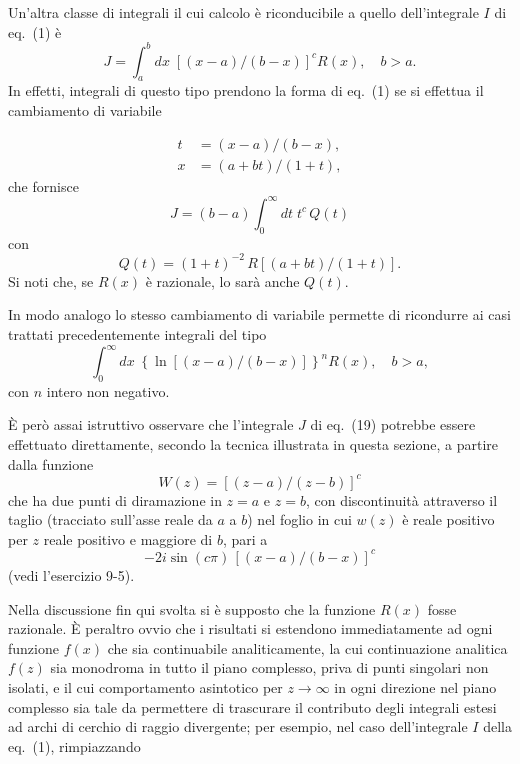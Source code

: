 \documentclass[11pt, a4paper]{book}
\numberwithin{equation}{section}
\begin{document}
\medskip
Un'altra classe di integrali il cui calcolo è riconducibile a quello
dell'integrale $I$ di eq.~(1) è
\begin{equation}
    J = \int_a^b dx\; \left[(x-a)/(b-x)\right]^c R(x), \quad b > a. \tag{19}
\end{equation}
In effetti, integrali di questo tipo prendono la forma di eq.~(1) se si effettua
il cambiamento di variabile


\begin{align}
    t &= (x-a)/(b-x), \tag{20a}\\
    x &= (a+bt)/(1+t), \tag{20b}
\end{align}
che fornisce
\begin{equation}
    J = (b-a)\int_0^\infty dt\; t^c\, Q(t) \tag{21}
\end{equation}
con
\begin{equation}
    Q(t) = (1+t)^{-2}\, R\!\left[(a+bt)/(1+t)\right]. \tag{22}
\end{equation}
Si noti che, se $R(x)$ è razionale, lo sarà anche $Q(t)$.

In modo analogo lo stesso cambiamento di variabile permette di ricondurre
ai casi trattati precedentemente integrali del tipo
\[
    \int_0^\infty dx\; \left\{\ln\left[(x-a)/(b-x)\right]\right\}^n R(x), \quad b > a,
\]
con $n$ intero non negativo.

\medskip
È però assai istruttivo osservare che l'integrale $J$ di eq.~(19) potrebbe
essere effettuato direttamente, secondo la tecnica illustrata in questa sezione,
a partire dalla funzione
\[
    W(z) = \left[(z-a)/(z-b)\right]^c
\]
che ha due punti di diramazione in $z=a$ e $z=b$, con discontinuità attraverso
il taglio (tracciato sull'asse reale da $a$ a $b$) nel foglio in cui $w(z)$ è
reale positivo per $z$ reale positivo e maggiore di $b$, pari a
\[
    -2i\sin(c\pi)\,\left[(x-a)/(b-x)\right]^c
\]
(vedi l'esercizio 9-5).

\medskip
Nella discussione fin qui svolta si è supposto che la funzione $R(x)$
fosse razionale. È peraltro ovvio che i risultati si estendono immediatamente
ad ogni funzione $f(x)$ che sia continuabile analiticamente, la cui continuazione
analitica $f(z)$ sia monodroma in tutto il piano complesso, priva di punti
singolari non isolati, e il cui comportamento asintotico per $z \to \infty$ in
ogni direzione nel piano complesso sia tale da permettere di trascurare il
contributo degli integrali estesi ad archi di cerchio di raggio divergente;
per esempio, nel caso dell'integrale $I$ della eq.~(1), rimpiazzando
\end{document}
